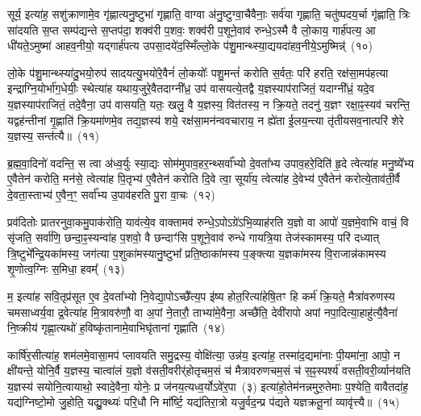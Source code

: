 सूर्य॒ इत्या॑ह॒ सशु॑क्राणामे॒व गृ॑ह्णात्यनु॒ष्टुभा॑ गृह्णाति॒ वाग्वा अ॑नु॒ष्टुग्वा॒चैवैनाः॒ सर्व॑या गृह्णाति॒ चतु॑ष्पदय॒र्चा गृ॑ह्णाति॒ त्रिः सा॑दयति स॒प्त सम्प॑द्यन्ते स॒प्तप॑दा॒ शक्व॑री प॒शवः॒ शक्व॑री प॒शूने॒वाव॑ रुन्धे॒\-ऽस्मै वै लो॒काय॒ गार्\mbox{}ह॑पत्य॒ आ धी॑यते॒\-ऽमुष्मा॑ आहव॒नीयो॒ यद्गार्\mbox{}ह॑पत्य उपसा॒दये॑द॒स्मिँल्लो॒के प॑शु॒मान्थ्स्या॒द्ययदा॑हव॒नीये॒\-ऽमुष्मिन्न्॑~(१०)

लो॒के प॑शु॒मान्थ्स्या॑दु॒भयो॒रुप॑ सादयत्यु॒भयो॑रे॒वैनं॑ लो॒कयोः᳚ पशु॒मन्तं॑ करोति स॒र्वतः॒ परि॑ हरति॒ रक्ष॑सा॒मप॑हत्या इन्द्राग्नि॒योर्भा॑ग॒धेयीः॒ स्थेत्या॑ह यथाय॒जुरे॒वैतदाग्नी᳚ध्र॒ उप॑ वासयत्ये॒तद्वै य॒ज्ञस्याप॑राजितं॒ यदाग्नी᳚ध्रं॒ यदे॒व य॒ज्ञस्याप॑राजितं॒ तदे॒वैना॒ उप॑ वासयति॒ यतः॒ खलु॒ वै य॒ज्ञस्य॒ वित॑तस्य॒ न क्रि॒यते॒ तदनु॑ य॒ज्ञꣳ रक्षा॒ꣴ॒स्यव॑ चरन्ति॒ यद्वह॑न्तीनां गृ॒ह्णाति॑ क्रि॒यमा॑णमे॒व तद्य॒ज्ञस्य॑ शये॒ रक्ष॑सा॒मन॑न्ववचाराय॒ न ह्ये॑ता ई॒लय॒न्त्या तृ॑तीयसव॒नात्परि॑ शेरे य॒ज्ञस्य॒ सन्त॑त्यै॥~(११)

{\anuvakamend[{स्या॒दिन्द्रो॑ गृह्णी॒याद॑स्त्व॒मुष्मि॑न्क्रि॒यते॒ षड्विꣳ॑शतिश्च}]}%

ब्र॒ह्म॒वा॒दिनो॑ वदन्ति॒ स त्वा अ॑ध्व॒र्युः स्या॒द्यः सोम॑मुपाव॒हर॒न्थ्सर्वा᳚भ्यो दे॒वता᳚भ्य उपाव॒हरे॒दिति॑ हृ॒दे त्वेत्या॑ह मनु॒ष्ये᳚भ्य ए॒वैतेन॑ करोति॒ मन॑से॒ त्वेत्या॑ह पि॒तृभ्य॑ ए॒वैतेन॑ करोति दि॒वे त्वा॒ सूर्या॑य॒ त्वेत्या॑ह दे॒वेभ्य॑ ए॒वैतेन॑ करोत्ये॒ताव॑ती॒र्वै दे॒वता॒स्ताभ्य॑ ए॒वैन॒ꣳ॒ सर्वा᳚भ्य उ॒पाव॑हरति पु॒रा वा॒चः~(१२)

प्रव॑दितोः प्रातरनुवा॒कमु॒पा\-क॑रोति॒ याव॑त्ये॒व वाक्तामव॑ रुन्धे॒\-ऽपो\-ऽग्रे॑\-ऽभि॒व्याह॑रति य॒ज्ञो वा आपो॑ य॒ज्ञमे॒वाभि वाचं॒ वि सृ॑जति॒ सर्वा॑णि॒ छन्दा॒ꣴ॒स्यन्वा॑ह प॒शवो॒ वै छन्दाꣳ॑सि प॒शूने॒वाव॑ रुन्धे गायत्रि॒या तेज॑स्कामस्य॒ परि॑ दध्यात् त्रि॒ष्टुभे᳚न्द्रि॒यका॑मस्य॒ जग॑त्या प॒शुका॑मस्यानु॒ष्टुभा᳚ प्रति॒ष्ठाका॑मस्य प॒ङ्क्त्या य॒ज्ञका॑मस्य वि॒राजान्न॑कामस्य शृ॒णोत्व॒ग्निः स॒मिधा॒ हवम्᳚~(१३)

म॒ इत्या॑ह सवि॒तृप्र॑सूत ए॒व दे॒वता᳚भ्यो नि॒वेद्या॒पो\-ऽच्छै᳚त्य॒प इ॑ष्य होत॒रित्या॑हेषि॒तꣳ हि कर्म॑ क्रि॒यते॒ मैत्रा॑वरुणस्य चमसाध्वर्य॒वा द्र॒वेत्या॑ह मि॒त्रावरु॑णौ॒ वा अ॒पां ने॒तारौ॒ ताभ्या॑मे॒वैना॒ अच्छै॑ति॒ देवी॑रापो अपां नपा॒दित्या॒हाहु॑त्यै॒वैना॑ नि॒ष्क्रीय॑ गृह्णा॒त्यथो॑ ह॒विष्कृ॑तानामे॒वाभिघृ॑तानां गृह्णाति~(१४)

कार्\mbox{}षि॑र॒सीत्या॑ह॒ शम॑लमे॒वासा॒मप॑ प्लावयति समु॒द्रस्य॒ वोक्षि॑त्या॒ उन्न॑य॒ इत्या॑ह॒ तस्मा॑द॒द्यमा॑नाः पी॒यमा॑ना॒ आपो॒ न क्षी॑यन्ते॒ योनि॒र्वै य॒ज्ञस्य॒ चात्वा॑लं य॒ज्ञो व॑सती॒वरीर्॑\mbox{}होतृचम॒सं च॑ मैत्रावरुणचम॒सं च॑ स॒ꣴ॒स्पर्श्य॑ वसती॒वरी॒र्व्यान॑यति य॒ज्ञस्य॑ सयोनि॒त्वायाथो॒ स्वादे॒वैना॒ योनेः॒ प्र ज॑नय॒त्यध्व॒र्यो\-ऽवे॑र॒पा~(३) इत्या॑हो॒तेम॑नन्नमुरु॒तेमाः प॒श्येति॒ वावैतदा॑ह॒ यद्य॑ग्निष्टो॒मो जु॒होति॒ यद्यु॒क्थ्यः॑ परि॒धौ नि मा᳚र्ष्टि॒ यद्य॑तिरा॒त्रो यजु॒र्वद॒न्प्र प॑द्यते यज्ञक्रतू॒नां व्यावृ॑त्त्यै॥~(१५)

